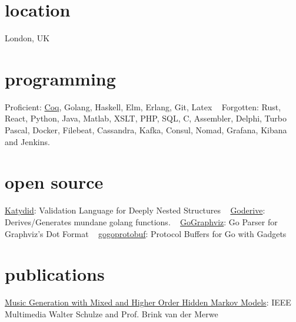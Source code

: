 \documentclass[print]{friggeri-cv-a4} %
\begin{document}

\begin{aside} %
\section{location}
London, UK
\section{programming}
Proficient: 
\href{https://coq.inria.fr/}{Coq}, Golang, Haskell, Elm, Erlang, Git, Latex
~
Forgotten:
Rust, React, Python, Java, Matlab, XSLT, PHP, SQL, C, Assembler, Delphi, Turbo Pascal, Docker, Filebeat, Cassandra, Kafka, Consul, Nomad, Grafana, Kibana and Jenkins.
\section{open source}
\href{https://github.com/katydid/katydid}{Katydid}: Validation Language for Deeply Nested Structures
~
\href{https://github.com/awalterschulze/goderive}{Goderive}: Derives/Generates mundane golang functions.
~
\href{https://github.com/awalterschulze/gographviz}{GoGraphviz}: Go Parser for Graphviz's Dot Format
~
\href{https://github.com/gogo/protobuf}{gogoprotobuf}: Protocol Buffers for Go with Gadgets
\section{publications}
\href{http://doi.ieeecomputersociety.org/10.1109/MMUL.2010.44}{Music Generation with Mixed and Higher Order Hidden Markov Models}:
{IEEE Multimedia}
{Walter Schulze and Prof. Brink van der Merwe}
\end{aside}
\end{document}
